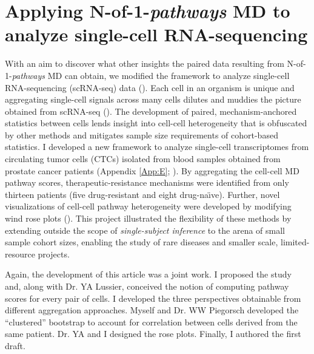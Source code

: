 \chapter{Applying N-of-1-\emph{pathways} MD to\\analyze single-cell RNA-sequencing} \label{Chap:ctcs}

\indent \indent With an aim to discover what other insights the paired data resulting from N-of-1-\emph{pathways} MD can obtain, we modified the framework to analyze single-cell RNA-sequencing (scRNA-seq) data (\cite{Tang2009}). Each cell in an organism is unique and aggregating single-cell signals across many cells dilutes and muddies the picture obtained from scRNA-seq (\cite{Schubert2011}). The development of paired, mechanism-anchored statistics between cells lends insight into cell-cell heterogeneity that is obfuscated by other methods and mitigates sample size requirements of cohort-based statistics. I developed a new framework to analyze single-cell transcriptomes from circulating tumor cells (CTCs) isolated from blood samples obtained from prostate cancer patients (Appendix \ref{App:E}; \cite{Patel2014,Schissler2016}). By aggregating the cell-cell MD pathway scores, therapeutic-resistance mechanisms were identified from only thirteen patients (five drug-resistant and eight drug-na\"{\i}ve). Further, novel visualizations of cell-cell pathway heterogeneity were developed by modifying wind rose plots (\cite{Court1963}). This project illustrated the flexibility of these methods by extending outside the scope of \emph{single-subject inference} to the arena of small sample cohort sizes, enabling the study of rare diseases and smaller scale, limited-resource projects.

Again, the development of this article was a joint work. I proposed the study and, along with Dr. YA Lussier, conceived the notion of computing pathway scores for every pair of cells. I developed the three perspectives obtainable from different aggregation approaches. Myself and Dr. WW Piegorsch developed the ``clustered'' bootstrap to account for correlation between cells derived from the same patient. Dr. YA and I designed the rose plots. Finally, I authored the first draft.
